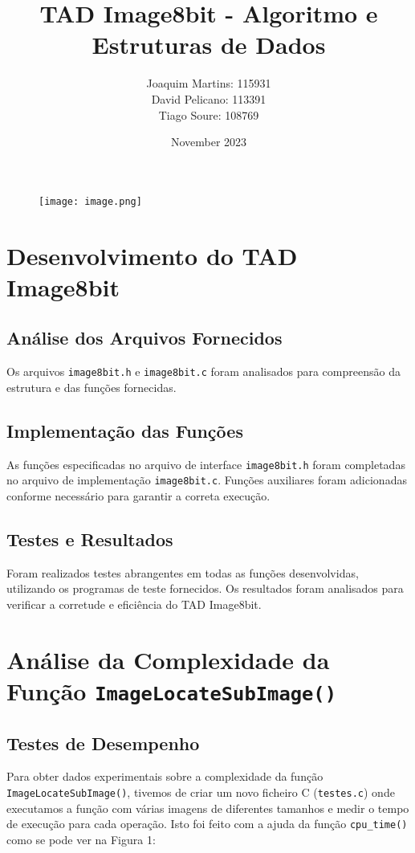 \documentclass{article}
\title{TAD Image8bit - Algoritmo e Estruturas de Dados}
\author{
  Joaquim Martins: 115931 \\
  David Pelicano: 113391 \\
  Tiago Soure: 108769
}
\date{November 2023}
\begin{document}
\maketitle

\begin{figure}[H]
  \centering
  \texttt{[image: image.png]}
\end{figure}  

\newpage
\renewcommand\contentsname{Índice}
\tableofcontents 
\newpage


\section{Desenvolvimento do TAD Image8bit}

\subsection{Análise dos Arquivos Fornecidos}
Os arquivos \texttt{image8bit.h} e \texttt{image8bit.c} foram analisados para compreensão da estrutura e das funções fornecidas.

\subsection{Implementação das Funções}
As funções especificadas no arquivo de interface \texttt{image8bit.h} foram completadas no arquivo de implementação \texttt{image8bit.c}. Funções auxiliares foram adicionadas conforme necessário para garantir a correta execução.

\subsection{Testes e Resultados}
Foram realizados testes abrangentes em todas as funções desenvolvidas, utilizando os programas de teste fornecidos. Os resultados foram analisados para verificar a corretude e eficiência do TAD Image8bit.

\section{Análise da Complexidade da Função \texttt{ImageLocateSubImage()}}

\subsection{Testes de Desempenho}
Para obter dados experimentais sobre a complexidade da função \texttt{ImageLocateSubImage()}, tivemos de criar um novo ficheiro C (\texttt{testes.c}) onde executamos a função com várias imagens de diferentes tamanhos e medir o tempo de execução para cada operação. Isto foi feito com a ajuda da função \texttt{cpu\_time()} como se pode ver na Figura 1:
\end{document}
